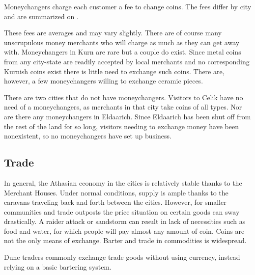 Moneychangers charge each customer a fee to change coins. The fees differ by city and are summarized on .


These fees are averages and may vary slightly. There are of course many unscrupulous money merchants who will charge as much as they can get away with. Moneychangers in Kurn are rare but a couple do exist. Since metal coins from any city-state are readily accepted by local merchants and no corresponding Kurnish coins exist there is little need to exchange such coins. There are, however, a few moneychangers willing to exchange ceramic pieces.

There are two cities that do not have moneychangers. Visitors to Celik have no need of a moneychangers, as merchants in that city take coins of all types. Nor are there any moneychangers in Eldaarich. Since Eldaarich has been shut off from the rest of the land for so long, visitors needing to exchange money have been nonexistent, so no moneychangers have set up business.

\subsection{Trade}
In general, the Athasian economy in the cities is relatively stable thanks to the Merchant Houses. Under normal conditions, supply is ample thanks to the caravans traveling back and forth between the cities. However, for smaller communities and trade outposts the price situation on certain goods can sway drastically. A raider attack or sandstorm can result in lack of necessities such as food and water, for which people will pay almost any amount of coin. Coins are not the only means of exchange. Barter and trade in commodities is widespread.

Dune traders commonly exchange trade goods without using currency, instead relying on a basic bartering system.


